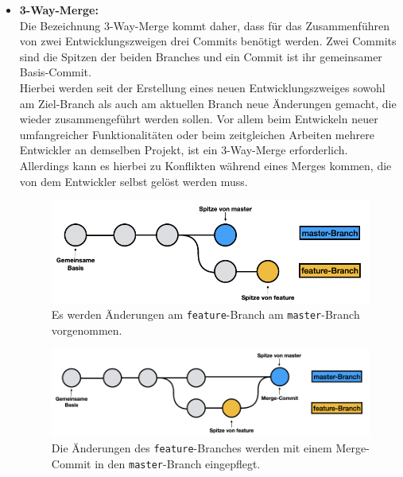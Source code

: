 \begin{itemize}
	\item \textbf{3-Way-Merge:}\\
		Die Bezeichnung 3-Way-Merge kommt daher, dass für das Zusammenführen von zwei Entwicklungszweigen 
		drei Commits benötigt werden. Zwei Commits sind die Spitzen der beiden Branches und ein Commit ist ihr
		gemeinsamer Basis-Commit.\\
		Hierbei werden seit der Erstellung eines neuen Entwicklungszweiges sowohl 
		am Ziel-Branch als auch am aktuellen Branch neue Änderungen gemacht, die wieder zusammengeführt
		werden sollen. Vor allem beim Entwickeln neuer umfangreicher Funktionalitäten oder beim zeitgleichen 
		Arbeiten mehrere Entwickler an demselben Projekt, ist ein 3-Way-Merge erforderlich. \\
		Allerdings kann es hierbei zu Konflikten während eines Merges kommen, die von dem Entwickler selbst
		gelöst werden muss.
		
		\begin{figure}[H]
		\begin{center}
			\includegraphics[scale=.8]{images/git-3-way-merge-before.png}
		\end{center}
			\caption{Es werden Änderungen am \texttt{feature}-Branch am \texttt{master}-Branch vorgenommen.}
		\end{figure}
		
		\begin{figure}[H]
		\begin{center}
			\includegraphics[scale=.8]{images/git-3-way-merge-after.png}
		\end{center}
			\caption{Die Änderungen des \texttt{feature}-Branches werden mit einem Merge-Commit in den 
				\texttt{master}-Branch eingepflegt.}
		\end{figure}
\end{itemize}


